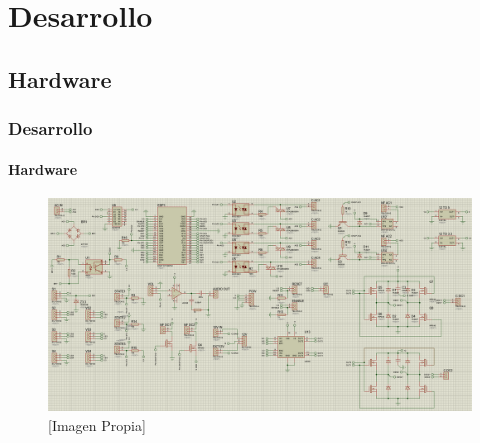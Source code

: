 \section{Desarrollo}

\subsection{Hardware}
\begin{frame}
\frametitle{Desarrollo}
\framesubtitle{Hardware}
\begin{multicols}{2}

\begin{figure}[!]
	\centering
	\caption{[Imagen Propia]}
	\label{fig:esq}
	\includegraphics[width=\linewidth]{Imagenes/Proteus}
\end{figure}


\end{multicols}
\end{frame}
